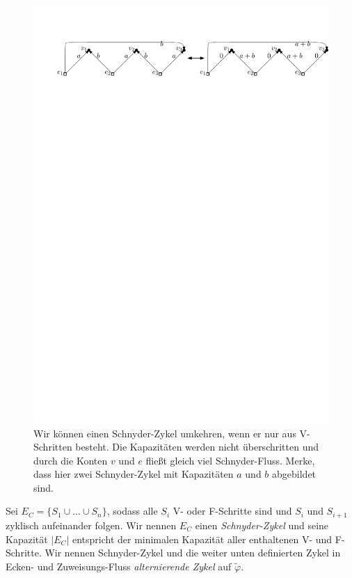 \begin{figure}[h]
\centering
\includegraphics[width=1\textwidth]{K_kreis.pdf}
\caption{Wir können einen Schnyder-Zykel umkehren, wenn er nur aus V-Schritten besteht. Die Kapazitäten werden nicht überschritten und durch die Konten $v$ und $e$ fließt gleich viel Schnyder-Fluss. Merke, dass hier zwei Schnyder-Zykel mit Kapazitäten $a$ und $b$ abgebildet sind.}
\label{K_turn}
\end{figure}

\begin{definition}
Sei $E_C = \{S_1\cup \ldots \cup S_n\}$, sodass alle $S_i$ V- oder F-Schritte sind und $S_i$ und $S_{i+1}$ zyklisch aufeinander folgen. Wir nennen $E_C$ einen \textit{Schnyder-Zykel} und seine Kapazität $|E_C|$ entspricht der minimalen Kapazität aller enthaltenen V- und F-Schritte. Wir nennen Schnyder-Zykel und die weiter unten definierten Zykel in Ecken- und Zuweisungs-Fluss \textit{alternierende Zykel} auf $\tilde{\varphi}$.
\end{definition}

